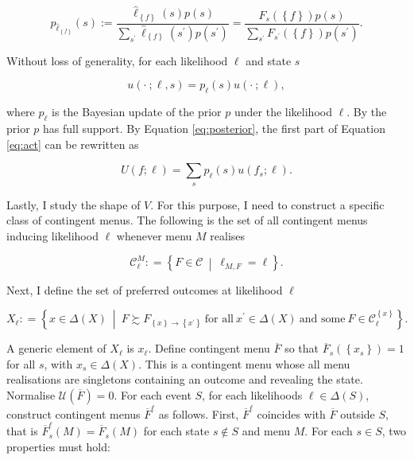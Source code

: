 \[
	p_{\widehat{\ell}_{\left\{ f \right\}}} \left( s \right) := \frac{\widehat{\ell}_{\left\{ f \right\}} \left( s \right) p \left( s \right)}{\sum_{s^{\prime}} \widehat{\ell}_{\left\{ f \right\}}\left( s^{\prime} \right)  p \left( s^{\prime} \right)} = \frac{F_{s} \left( \left\{ f \right\} \right) p \left( s \right)}{\sum_{s^{\prime}} F_{s^{\prime}} \left( \left\{ f \right\} \right) p \left( s^{\prime} \right)} .
\]

Without loss of generality, for each likelihood \( \ell \) and state \( s \)

\begin{equation}\label{eq:posterior}
	u \left( \cdot \: ; \ell , s \right) = p_{\ell} \left( s \right) u \left( \cdot \: ; \ell \right) ,
\end{equation}

where \( p_{\ell} \) is the Bayesian update of the prior \( p \) under the likelihood \( \ell \). By  the prior \( p \) has full support. By Equation \eqref{eq:posterior}, the first part of Equation \eqref{eq:act} can be rewritten as

\begin{equation}\label{eq:subprob}
	U \left(f ; \ell \right) = \sum_{s} p_{\ell} \left( s \right) u \left( f_{s} ; \ell \right).
\end{equation}

Lastly, I study the shape of \( V \). For this purpose, I need to construct a specific class of contingent menus. The following is the set of all contingent menus inducing likelihood \( \ell \) whenever menu \( M \) realises

\[
	\mathcal{C}^{M}_{\ell} : = \left\{ F \in \mathcal{C} \: \middle\vert \: \ell_{M,F} = \ell \right\} .
\]

Next, I define the set of preferred outcomes at likelihood \( \ell \)

\[
	X_{\ell} : = \left\{ x \in \Delta \left( X \right) \: \middle\vert  \: F \succsim F_{ \left\{ x  \right\} \rightarrow \left\{ x^{\prime} \right\} }  \: \text{for all} \: x^{\prime} \in \Delta \left( X \right) \: \text{and some} \: F \in \mathcal{C}^{\left\{ x \right\} }_{\ell} \right\} .
\]

A generic element of \( X_{\ell} \) is \( x_{\ell} \). Define contingent menu \( \overline{F} \) so that \( \overline{F}_s \left( \left\{ x_s \right\} \right) = 1 \) for all \( s \), with \( x_s \in \Delta \left( X \right) \). This is a contingent menu whose all menu realisations are singletons containing an outcome and revealing the state. Normalise \( \mathscr{U} \left( \overline{F} \right) = 0 \). For each event \( S \), for each likelihoods \( \ell \in \Delta \left( S \right) \), construct contingent menus \( \overline{F}^{\ell} \) as follows. First, \( \overline{F}^{\ell} \) coincides with \( \overline{F} \) outside \( S \), that is \( \overline{F}^{\ell}_s \left( M \right) = \overline{F}_s \left( M \right) \) for each state \( s \notin S \) and menu \( M \). For each \( s \in S \), two properties must hold:

